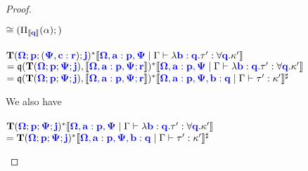 \documentclass[sigplan,10pt,review,anonymous]{acmart}
\newcommand{\blum}[1]{\mathbf{\color{blue}{#1}}}
\newcommand{\sem}[1]{\llbracket #1 \rrbracket}
\newcommand{\mbf}[1]{\mathbf{#1}}
\begin{document}
\begin{proof}
\begin{description}
\begin{description}
$\cong (\Pi_{\sem{\blum{q}}}(\alpha) ; )$\\~\\

$\mbf{T}(\blum{\Omega} ; \blum{p} ; (\blum{\Psi}, \blum{c : r}) ; \blum{j})^*\sem{\blum{\Omega, a : p, \Psi} \mid \Gamma \vdash \lambda \blum{b : q}. \tau' : \forall \blum{q}. \kappa'}$\\
$= \frak q(\mbf{T}(\blum{\Omega};\blum{p};\blum{\Psi};\blum{j}), \sem{\blum{\Omega,a:p,\Psi ; r}})^* \sem{\blum{\Omega, a : p, \Psi} \mid \Gamma \vdash \lambda \blum{b : q}. \tau' : \forall \blum{q}. \kappa'}$\\
$= \frak q(\mbf{T}(\blum{\Omega};\blum{p};\blum{\Psi};\blum{j}), \sem{\blum{\Omega,a:p,\Psi ; r}})^* \sem{\blum{\Omega, a : p, \Psi, b : q} \mid \Gamma \vdash \tau' : \kappa'}^\sharp$\\

\fi


\end{description}

We also have\\~\\
$\mbf{T}(\blum{\Omega} ; \blum{p} ; \blum{\Psi} ; \blum{j})^*\sem{\blum{\Omega, a : p, \Psi} \mid \Gamma \vdash \lambda \blum{b : q}. \tau' : \forall \blum{q}. \kappa'}$\\
$= \mbf{T}(\blum{\Omega} ; \blum{p} ; \blum{\Psi} ; \blum{j})^*\sem{\blum{\Omega, a : p, \Psi, b : q} \mid \Gamma \vdash \tau' : \kappa'}^\sharp$\\

\end{description}
\end{proof}


\end{document}
